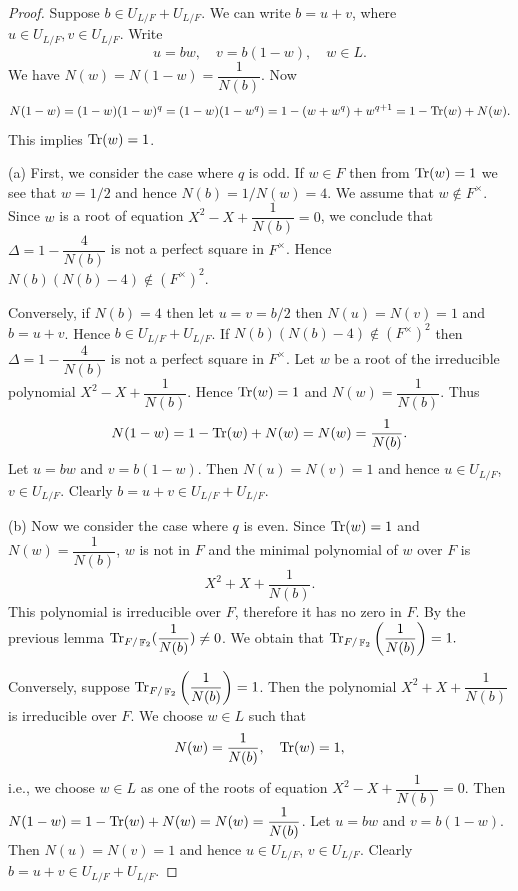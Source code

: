 \documentclass[11pt, a4paper]{amsart}
\theoremstyle{definition}
\DeclareMathOperator{\F}{\mathbb{F}}
\numberwithin{equation}{section}
\begin{document}
\begin{proof}
    Suppose $b\in U_{L/F}+U_{L/F}$. We can write $b=u+v$, where $u\in U_{L/F}, v\in U_{L/F}$. Write
    \[
    u=bw,\quad v=b(1-w), \quad w\in L.
    \]
    We have $N(w)=N(1-w)=\dfrac{1}{N(b)}$. Now
    \[
  N(1-w) = (1-w) (1-w)^q=(1-w)(1-w^q)=1-(w+w^q)+w^{q+1}=1-{\rm Tr}(w) + N(w).
    \]
    This implies  ${\rm Tr}(w)=1$.

   (a) First, we consider the case where $q$ is odd. If $w\in F$ then from ${\rm Tr}(w)=1$ we see that $w=1/2$ and hence $N(b)=1/N(w)=4$. We assume that $w\not\in F^\times$. Since $w$ is a root of equation $X^2- X +\dfrac{1}{N(b)}=0$, we conclude that $\Delta=1-\dfrac{4}{N(b)}$ is not a perfect square in $F^\times$. Hence $N(b)(N(b)-4)\not\in (F^\times)^2$.

    

     Conversely, if $N(b)=4$ then let $u=v=b/2$ then $N(u)=N(v)=1$ and $b=u+v$. Hence $b\in U_{L/F}+U_{L/F}$. If $N(b)(N(b)-4)\not\in (F^\times)^2$ then
      $\Delta=1-\dfrac{4}{N(b)}$ is  not a perfect square in $F^\times$. Let $w$ be a root of the irreducible polynomial $X^2- X +\dfrac{1}{N(b)}$. Hence ${\rm Tr}(w)=1$ and $N(w)=\dfrac{1}{N(b)}$. Thus
     \[
     N(1-w)= 1-{\rm Tr}(w) + N(w)=N(w)=\dfrac{1}{N(b)}.
     \]
     Let $u=bw$ and $v=b(1-w)$. Then $N(u)=N(v)=1$ and hence $u\in U_{L/F}$, $v\in U_{L/F}$. Clearly $b=u+v\in U_{L/F}+U_{L/F}$.



(b)    Now we consider the case where $q$ is even. Since ${\rm Tr}(w)=1$ and $N(w)=\dfrac{1}{N(b)}$, $w$ is not in $F$ and the minimal polynomial of $w$ over $F$ is 
    \[
    X^2+X + \dfrac{1}{N(b)}.
    \]
    This polynomial is irreducible over $F$, therefore it has no zero in $F$. By the previous lemma ${\rm Tr}_{F/\F_2}(\dfrac{1}{N(b)})\not=0$. We obtain that 
    \({\rm Tr}_{F/\F_2}\left(\dfrac{1}{N(b)}\right)=1. \)
    
        Conversely, suppose ${\rm Tr}_{F/\F_2}\left(\dfrac{1}{N(b)}\right)=1$. Then the polynomial  $X^2+X + \dfrac{1}{N(b)}$ is irreducible over $F$. We choose $w\in L$ such that 
    \[
    N(w)=\dfrac{1}{N(b)},\quad {\rm Tr}(w)=1,
    \]
    i.e., we choose $w\in L$ as one of the roots of equation $X^2-X+\dfrac{1}{N(b)}=0$. Then $N(1-w)=1-{\rm Tr}(w)+N(w)=N(w)=\dfrac{1}{N(b)}$. Let $u=bw$ and $v=b(1-w)$. Then $N(u)=N(v)=1$ and hence $u\in U_{L/F}$, $v\in U_{L/F}$. Clearly $b=u+v\in U_{L/F}+U_{L/F}$.
\end{proof}
\end{document}
